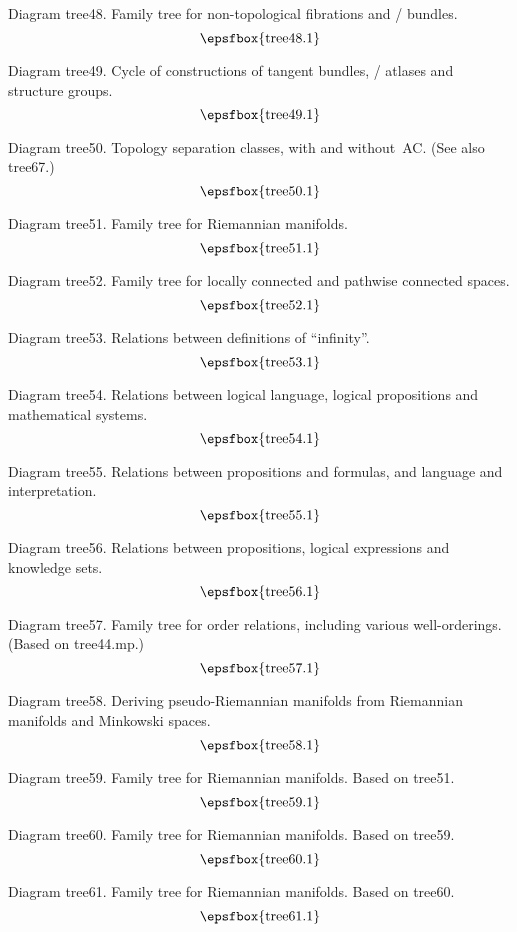 Diagram tree48. Family tree for non-topological fibrations and \fibre/ bundles.
$$
\centerline{\epsfbox{tree48.1}}
$$

Diagram tree49. Cycle of constructions of tangent bundles, \fibre/ atlases and
structure groups.
$$
\centerline{\epsfbox{tree49.1}}
$$

\filleject

Diagram tree50. Topology separation classes, with and without~AC. (See also
tree67.)
$$
\centerline{\epsfbox{tree50.1}}
$$

Diagram tree51. Family tree for Riemannian manifolds.
$$
\centerline{\epsfbox{tree51.1}}
$$

Diagram tree52. Family tree for locally connected and pathwise connected spaces.
$$
\centerline{\epsfbox{tree52.1}}
$$

Diagram tree53. Relations between definitions of ``infinity''.
$$
\centerline{\epsfbox{tree53.1}}
$$

\filleject

Diagram tree54. Relations between logical language, logical propositions and
mathematical systems.
$$
\centerline{\epsfbox{tree54.1}}
$$

Diagram tree55. Relations between propositions and formulas, and language and
interpretation.
$$
\centerline{\epsfbox{tree55.1}}
$$

Diagram tree56. Relations between propositions, logical expressions and
knowledge sets.
$$
\centerline{\epsfbox{tree56.1}}
$$

Diagram tree57. Family tree for order relations, including various
well-orderings. (Based on tree44.mp.)
$$
\centerline{\epsfbox{tree57.1}}
$$

\filleject

Diagram tree58. Deriving pseudo-Riemannian manifolds from Riemannian manifolds
and Minkowski spaces.
$$
\centerline{\epsfbox{tree58.1}}
$$

Diagram tree59. Family tree for Riemannian manifolds. Based on tree51.
$$
\centerline{\epsfbox{tree59.1}}
$$

Diagram tree60. Family tree for Riemannian manifolds. Based on tree59.
$$
\centerline{\epsfbox{tree60.1}}
$$

Diagram tree61. Family tree for Riemannian manifolds. Based on tree60.
$$
\centerline{\epsfbox{tree61.1}}
$$

